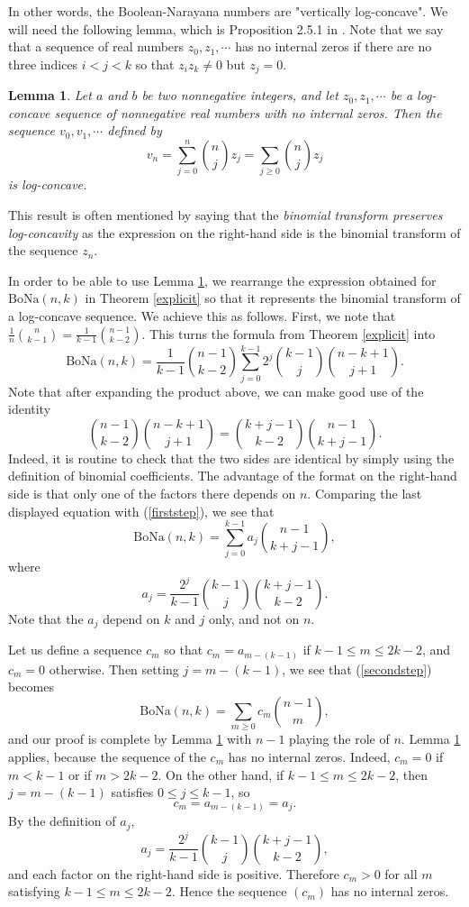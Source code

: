 \documentclass[11pt]{article}
\newcommand{\bona}{\mathrm{BoNa}}
\newtheorem{lemma}[theorem]{Lemma}
\begin{document}
In other words, the Boolean-Narayana numbers are "vertically log-concave". 
We will need the following lemma, which is Proposition 2.5.1 in \cite{brenti}. Note that we say that a sequence of real numbers $z_0,z_1,\cdots $ has
no internal zeros if there are no three indices $i<j<k$ so that $z_iz_k\neq 0$ but $z_j=0$.

\begin{lemma} \label{bintransform} Let $a$ and $b$ be two nonnegative integers, and let $z_0,z_1,\cdots $ be a log-concave sequence of nonnegative real numbers with no internal zeros.
Then the sequence $v_0,v_1,\cdots $ defined by
\[v_n = \sum_{j=0}^n {n \choose j}z_j =  \sum_{j\geq 0} {n \choose j}z_j \]
is log-concave.
\end{lemma}
This result is often mentioned by saying that the {\em binomial transform preserves log-concavity} as the expression on the right-hand  side is the binomial transform
of the sequence $z_n$.

In order to be able to use Lemma \ref{bintransform}, we rearrange the expression obtained for $\bona(n,k)$ in Theorem \ref{explicit} so that it represents the
binomial transform of a log-concave sequence. We achieve this as follows.
First, we note that $\frac{1}{n}{n\choose k-1} = \frac{1}{k-1}{n-1\choose k-2}$. This turns the formula from Theorem \ref{explicit} into
\begin{equation} \label{firststep} \bona(n,k)=\frac{1}{k-1} {n -1 \choose k-2}   \sum_{j=0}^{k-1} 2^j {k-1\choose j}{n-k+1\choose j+1} .\end{equation}
Note that after expanding the product above, we can make good use of the identity
\[{n-1\choose k-2}{n-k+1\choose j+1} = {k+j-1\choose k-2}{n-1\choose k+j-1} .\]
Indeed, it is routine to check that the two sides are identical  by simply using the definition of binomial coefficients. The advantage of the format on the right-hand
side is that only one of the factors there depends on $n$. Comparing the last displayed equation with (\ref{firststep}), we see that
\begin{equation} \label{secondstep} \bona(n,k)=\sum_{j=0}^{k-1} a_j {n-1\choose k+j-1},\end{equation}
where \[a_j=\frac{2^{j}}{k-1} {k-1\choose j} {k+j-1\choose k-2}.\]
Note that the $a_j$ depend on $k$ and $j$ only, and not on $n$.

Let us define a sequence $c_m$ so that $c_m=a_{m-(k-1)}$ if $k-1\leq m\leq 2k-2$, and $c_m=0$ otherwise. Then setting $j=m-(k-1)$, we see that (\ref{secondstep}) becomes
\[\bona(n,k)=\sum_{m\geq 0}c_m {n-1\choose m},\] and our proof is complete by Lemma \ref{bintransform} with $n-1$ playing the role of $n$.
Lemma \ref{bintransform} applies, because the sequence of the $c_m$ has no internal zeros. 
Indeed, \(c_m=0\) if \(m<k-1\) or if \(m>2k-2\). On the other hand, if
\(k-1\le m\le 2k-2\), then \(j=m-(k-1)\) satisfies \(0\le j\le k-1\), so
\[
c_m=a_{m-(k-1)}=a_j.
\]
By the definition of \(a_j\),
\[
a_j=\frac{2^j}{k-1}\binom{k-1}{j}\binom{k+j-1}{k-2},
\]
and each factor on the right-hand side is positive. Therefore \(c_m>0\) for
all \(m\) satisfying \(k-1\le m\le 2k-2\). Hence the sequence \((c_m)\) has
no internal zeros.
\end{document}
